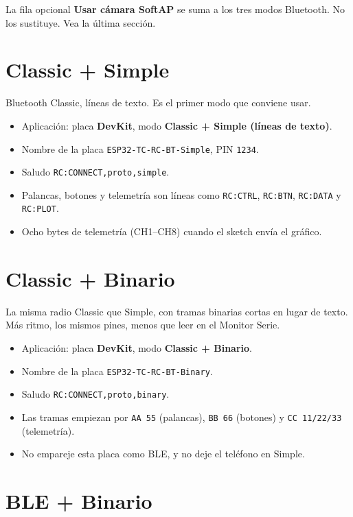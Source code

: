 \documentclass[12pt,a4paper]{article}
\newcommand{\code}[1]{\nolinkurl{#1}}
\newcommand{\ui}[1]{\textsf{\textbf{#1}}}
\begin{document}
La fila opcional \ui{Usar cámara SoftAP} se suma a los tres modos
Bluetooth. No los sustituye. Vea la última sección.

\section{Classic + Simple}

Bluetooth Classic, líneas de texto. Es el primer modo que conviene usar.

\begin{itemize}[leftmargin=1.4cm]
  \item Aplicación: placa \ui{DevKit}, modo
        \ui{Classic + Simple (líneas de texto)}.
  \item Nombre de la placa \code{ESP32-TC-RC-BT-Simple}, PIN \code{1234}.
  \item Saludo \code{RC:CONNECT,proto,simple}.
  \item Palancas, botones y telemetría son líneas como \code{RC:CTRL},
        \code{RC:BTN}, \code{RC:DATA} y \code{RC:PLOT}.
  \item Ocho bytes de telemetría (CH1--CH8) cuando el sketch envía el
        gráfico.
\end{itemize}

\section{Classic + Binario}

La misma radio Classic que Simple, con tramas binarias cortas en lugar de
texto. Más ritmo, los mismos pines, menos que leer en el Monitor Serie.

\begin{itemize}[leftmargin=1.4cm]
  \item Aplicación: placa \ui{DevKit}, modo \ui{Classic + Binario}.
  \item Nombre de la placa \code{ESP32-TC-RC-BT-Binary}.
  \item Saludo \code{RC:CONNECT,proto,binary}.
  \item Las tramas empiezan por \code{AA 55} (palancas), \code{BB 66}
        (botones) y \code{CC 11/22/33} (telemetría).
  \item No empareje esta placa como BLE, y no deje el teléfono en Simple.
\end{itemize}

\section{BLE + Binario}
\end{document}
